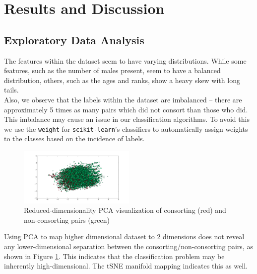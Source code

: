 \documentclass[twoside,twocolumn,paper=letter,fontsize=11pt]{article}
\begin{document}
\section{Results and Discussion}
\subsection{Exploratory Data Analysis}
The features within the dataset seem to have varying distributions. While some
features, such as the number of males present, seem to have a balanced
distribution, others, such as the ages and ranks, show a heavy skew with long
tails.\\

Also, we observe that the labels within the dataset are imbalanced -- there are
approximately 5 times as many pairs which did not consort than those who did.
This imbalance may cause an issue in our classification algorithms. To avoid
this we use the \texttt{weight} for \texttt{scikit-learn}'s classifiers to
automatically assign weights to the classes based on the incidence of labels.\\
\begin{figure}
      \centering
          \includegraphics[width=0.5\textwidth]{../figs/consort_non_consort_visualization_pca.png}
  \caption{Reduced-dimensionality PCA visualization of consorting (red) and
  non-consorting pairs (green)}
  \label{fig:pca_vis}
\end{figure}

Using PCA to map higher dimensional dataset to 2 dimensions does not reveal
any lower-dimensional separation between the consorting/non-consorting pairs, as
shown in Figure \ref{fig:pca_vis}.
This indicates that the classification problem may be inherently
high-dimensional. The tSNE manifold mapping indicates this as well.
\end{document}
